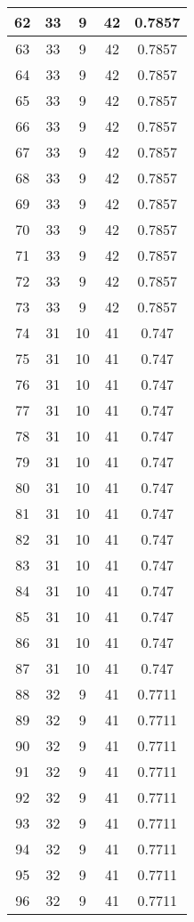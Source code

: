 \documentclass[letterpaper, 12pt]{article}
\begin{document}
\begin{longtable}{|c|c|c|c|c|}
\hline
62 & 33 & 9 & 42 & 0.7857 \\
\hline
63 & 33 & 9 & 42 & 0.7857 \\
\hline
64 & 33 & 9 & 42 & 0.7857 \\
\hline
65 & 33 & 9 & 42 & 0.7857 \\
\hline
66 & 33 & 9 & 42 & 0.7857 \\
\hline
67 & 33 & 9 & 42 & 0.7857 \\
\hline
68 & 33 & 9 & 42 & 0.7857 \\
\hline
69 & 33 & 9 & 42 & 0.7857 \\
\hline
70 & 33 & 9 & 42 & 0.7857 \\
\hline
71 & 33 & 9 & 42 & 0.7857 \\
\hline
72 & 33 & 9 & 42 & 0.7857 \\
\hline
73 & 33 & 9 & 42 & 0.7857 \\
\hline
74 & 31 & 10 & 41 & 0.747 \\
\hline
75 & 31 & 10 & 41 & 0.747 \\
\hline
76 & 31 & 10 & 41 & 0.747 \\
\hline
77 & 31 & 10 & 41 & 0.747 \\
\hline
78 & 31 & 10 & 41 & 0.747 \\
\hline
79 & 31 & 10 & 41 & 0.747 \\
\hline
80 & 31 & 10 & 41 & 0.747 \\
\hline
81 & 31 & 10 & 41 & 0.747 \\
\hline
82 & 31 & 10 & 41 & 0.747 \\
\hline
83 & 31 & 10 & 41 & 0.747 \\
\hline
84 & 31 & 10 & 41 & 0.747 \\
\hline
85 & 31 & 10 & 41 & 0.747 \\
\hline
86 & 31 & 10 & 41 & 0.747 \\
\hline
87 & 31 & 10 & 41 & 0.747 \\
\hline
88 & 32 & 9 & 41 & 0.7711 \\
\hline
89 & 32 & 9 & 41 & 0.7711 \\
\hline
90 & 32 & 9 & 41 & 0.7711 \\
\hline
91 & 32 & 9 & 41 & 0.7711 \\
\hline
92 & 32 & 9 & 41 & 0.7711 \\
\hline
93 & 32 & 9 & 41 & 0.7711 \\
\hline
94 & 32 & 9 & 41 & 0.7711 \\
\hline
95 & 32 & 9 & 41 & 0.7711 \\
\hline
96 & 32 & 9 & 41 & 0.7711 \\

\end{longtable}
\end{document}
